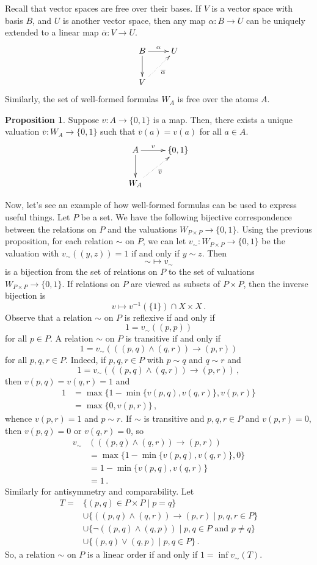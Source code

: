 \documentclass[12pt]{article}
\theoremstyle{definition}
\newtheorem*{proposition}{\color{blue} Proposition}
\begin{document}
\begin{multicols*}{2}
Recall that vector spaces are free over their bases. If $V$ is a vector space with basis $B$, and $U$ is another vector space, then any map $\alpha: B\rightarrow U$ can be uniquely extended to a linear map $\overline{\alpha}: V\rightarrow U$.
\[\xymatrix{
	B \ar[r]^-\alpha\ar[d] & U \\
	V \ar@{.>}[ur]_{\overline{\alpha}}
}\]
Similarly, the set of well-formed formulas $W_A$ is free over the atoms $A$.
\begin{proposition}
Suppose $v: A\rightarrow\{0,1\}$ is a map. Then, there exists a unique valuation $\overline{v}: W_A\rightarrow \{0,1\}$ such that $\overline{v}(a) = v(a)$ for all $a\in A$.
\[\xymatrix{
	A \ar[r]^-v\ar[d] & \{0,1\} \\
	W_A \ar@{.>}[ur]_{\overline{v}}
}\]
\end{proposition}

Now, let's see an example of how well-formed formulas can be used to express useful things. Let $P$ be a set. We have the following bijective correspondence between the relations on $P$ and the valuations $W_{P\times P}\rightarrow\{0,1\}$. Using the previous proposition, for each relation $\sim$ on $P$, we can let $v_{\sim}: W_{P\times P}\rightarrow\{0,1\}$ be the valuation with $v_{\sim}((y,z))=1$ if and only if $y\sim z$. Then \[{\sim}\mapsto v_{\sim}\] is a bijection from the set of relations on $P$ to the set of valuations $W_{P\times P}\rightarrow\{0,1\}$. If relations on $P$ are viewed as subsets of $P\times P$, then the inverse bijection is
\[
	v \mapsto v^{-1}(\{1\})\cap X\times X\,.
\]
Observe that a relation $\sim$ on $P$ is reflexive if and only if
\[
	1 = v_{\sim}( (p,p) )
\]
for all $p\in P$. A relation $\sim$ on $P$ is transitive if and only if
\[
	 1 = v_{\sim}( ((p,q)\land(q,r))\rightarrow(p,r) )
\]
for all $p,q,r\in P$. Indeed, if $p,q,r\in P$ with $p\sim q$ and $q\sim r$ and
\[
	1 = v_{\sim}( ((p,q)\land(q,r))\rightarrow(p,r) )\,,
\]
then $v(p,q)=v(q,r)=1$ and
\begin{align*}
	1 &= \max\{1 - \min\{v(p,q), v(q,r)\}, v(p,r)\} \\
	&= \max\{0, v(p,r)\}\,,
\end{align*}
whence $v(p,r)=1$ and $p\sim r$. If $\sim$ is transitive and $p,q,r\in P$ and $v(p,r)=0$, then $v(p,q)=0$ or $v(q,r)=0$, so
\begin{align*}
	v_{\sim}&( ((p,q)\land(q,r))\rightarrow(p,r) ) \\
	&= \max\{1 - \min\{v(p,q), v(q,r)\}, 0\} \\
	&= 1 - \min\{v(p,q), v(q,r)\} \\
	&= 1\,.
\end{align*}
Similarly for antisymmetry and comparability. Let
\begin{align*}
	T = &\{(p,q)\in P\times P \mid p=q\} \\
	&\cup \{((p,q)\land(q,r))\rightarrow(p,r) \mid p,q,r\in P\} \\
	&\cup \{\neg((p,q)\land(q,p)) \mid p,q\in P\text{ and }p\neq q\} \\
	&\cup \{(p,q)\lor(q,p) \mid p,q\in P\}\,.
\end{align*}
 So, a relation $\sim$ on $P$ is a linear order if and only if $1 = \inf v_{\sim}(T)$.


\end{multicols*}
\end{document}
